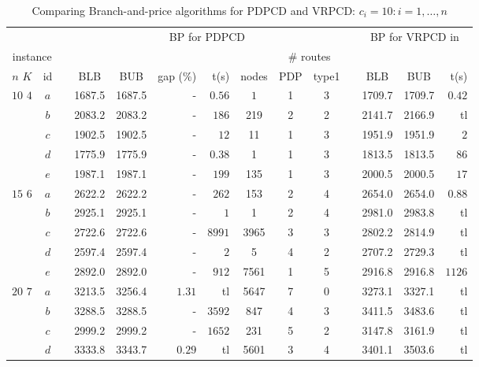 \begin{table}[!htb]
\footnotesize
\caption{Comparing Branch-and-price algorithms for PDPCD and VRPCD: $c_i = 10:i = 1,\dots,n$}
\begin{tabular}{cccccrrccccccr}
\multicolumn{2}{c}{} & & \multicolumn{7}{c}{BP for PDPCD} & &
\multicolumn{3}{c}{BP for VRPCD in \cite{inoc11}} \\
\cline{4-10} \cline{12-14}
 \multicolumn{2}{c}{instance} & & & & & & & \multicolumn{2}{c}{\# routes} & & & & \\
 \cline{1-2} \cline{9-10}
$n$ \hspace{4mm} $K$ & id & & BLB & BUB & gap (\%) & t(s) & nodes & PDP & type1 &
& BLB & BUB & t(s) \\
\hline
\multirow{5}{*}{$10$ \hspace{5mm} $4$}
& $a$ & & 1687.5 & 1687.5 & - & $0.56$ & $1$ & 1 & 3 & & 1709.7 & 1709.7 & $0.42$ \\
& $b$ & & 2083.2 & 2083.2 & - & $186$ & 219 & 2 & 2 & & 2141.7 & 2166.9 & tl \\
& $c$ & & 1902.5 & 1902.5 & - & $12$ & 11 & 1 & 3 & & 1951.9 & 1951.9 & $2$ \\
& $d$ & & 1775.9 & 1775.9 & - & $0.38$ & 1 & 1 & 3 & & 1813.5 & 1813.5 & $86$ \\
& $e$ & & 1987.1 & 1987.1 & - & $199$ & 135 & 1 & 3 & & 2000.5 & 2000.5 & $17$ \\
\hline
\multirow{5}{*}{$15$  \hspace{5mm} $6$}
& $a$ & & 2622.2 & 2622.2 & - & $262$ & 153 & 2 & 4 & & 2654.0 & 2654.0 & $0.88$ \\
& $b$ & & 2925.1 & 2925.1 & - & $1$ & 1 & 2 & 4 & & 2981.0 & 2983.8 & tl \\
& $c$ & & 2722.6 & 2722.6 & - & $8991$ & 3965 & 3 & 3 & & 2802.2 & 2814.9 & tl \\
& $d$ & & 2597.4 & 2597.4 & - & $2$ & 5 & 4 & 2 & & 2707.2 & 2729.3 & tl \\
& $e$ & & 2892.0 & 2892.0 & - & $912$ & 7561 & 1 & 5 & & 2916.8 & 2916.8 & $1126$ \\
\hline
\multirow{5}{*}{$20$  \hspace{5mm} $7$}
& $a$ & & 3213.5 & 3256.4 & $1.31$ & tl & 5647 & 7 & 0 & & 3273.1 & 3327.1 & tl \\
& $b$ & & 3288.5 & 3288.5 & - & $3592$ & 847 & 4 & 3 & & 3411.5 & 3483.6 & tl \\
& $c$ & & 2999.2 & 2999.2 & - & $1652$ & 231 & 5 & 2 & & 3147.8 & 3161.9 & tl \\
& $d$ & & 3333.8 & 3343.7 & $0.29$ & tl & 5601 & 3 & 4 & & 3401.1 & 3503.6 & tl \\

\end{tabular}
\end{table}
